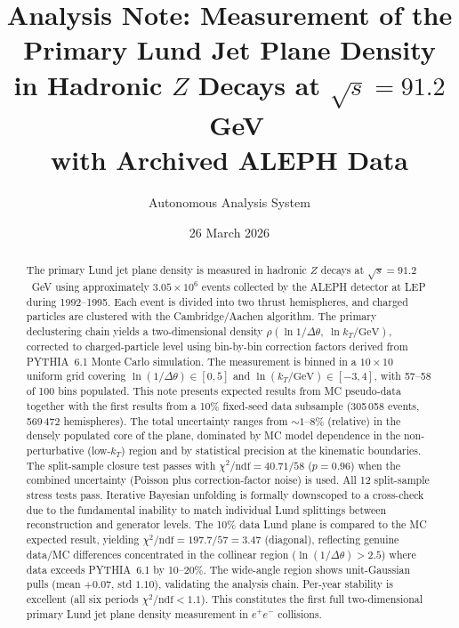 \documentclass[11pt,a4paper]{article}
\title{Analysis Note: Measurement of the Primary Lund Jet Plane Density\\
in Hadronic $Z$ Decays at $\sqrt{s} = 91.2$~GeV\\
with Archived ALEPH Data}
\author{Autonomous Analysis System}
\date{26 March 2026}
\begin{document}
\maketitle

\begin{abstract}
The primary Lund jet plane density is measured in hadronic $Z$ decays
at $\sqrt{s} = 91.2$~GeV using approximately $3.05 \times 10^6$
events collected by the ALEPH detector at LEP during 1992--1995.
Each event is divided into two thrust hemispheres, and charged
particles are clustered with the Cambridge/Aachen algorithm.
The primary declustering chain yields a two-dimensional density
$\rho(\ln 1/\Delta\theta,\;\ln k_T/\text{GeV})$, corrected to
charged-particle level using bin-by-bin correction factors derived
from PYTHIA~6.1 Monte Carlo simulation.  The measurement is binned in a
$10 \times 10$ uniform grid covering $\ln(1/\Delta\theta) \in [0, 5]$
and $\ln(k_T/\text{GeV}) \in [-3, 4]$, with 57--58 of 100 bins
populated.  This note presents expected results from MC pseudo-data
together with the first results from a 10\% fixed-seed data subsample
(305\,058 events, 569\,472 hemispheres).  The total uncertainty ranges
from $\sim\!1$--$8\%$ (relative) in the densely populated core of the
plane, dominated by MC model dependence in the non-perturbative
(low-$k_T$) region and by statistical precision at the kinematic
boundaries.  The split-sample closure test passes with
$\chi^2/\text{ndf} = 40.71/58$ ($p = 0.96$) when the combined
uncertainty (Poisson plus correction-factor noise) is used.  All 12
split-sample stress tests pass.  Iterative Bayesian unfolding is
formally downscoped to a cross-check due to the fundamental inability
to match individual Lund splittings between reconstruction and
generator levels.  The 10\% data Lund plane is compared to the MC
expected result, yielding $\chi^2/\text{ndf} = 197.7/57 = 3.47$
(diagonal), reflecting genuine data/MC differences concentrated in the
collinear region ($\ln(1/\Delta\theta) > 2.5$) where data exceeds
PYTHIA~6.1 by 10--20\%.  The wide-angle region shows unit-Gaussian
pulls (mean $+0.07$, std $1.10$), validating the analysis chain.
Per-year stability is excellent (all six periods
$\chi^2/\text{ndf} < 1.1$).  This constitutes the first full
two-dimensional primary Lund jet plane density measurement in
$e^+e^-$ collisions.
\end{abstract}
\end{document}
